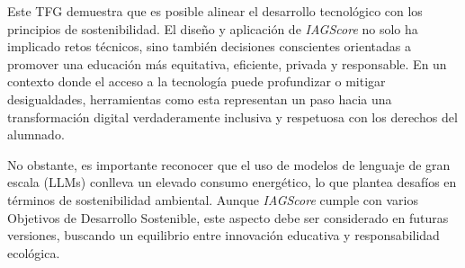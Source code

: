 Este TFG demuestra que es posible alinear el desarrollo tecnológico con los principios de sostenibilidad. El diseño y aplicación de \textit{IAGScore} no solo ha implicado retos técnicos, sino también decisiones conscientes orientadas a promover una educación más equitativa, eficiente, privada y responsable. En un contexto donde el acceso a la tecnología puede profundizar o mitigar desigualdades, herramientas como esta representan un paso hacia una transformación digital verdaderamente inclusiva y respetuosa con los derechos del alumnado.

No obstante, es importante reconocer que el uso de modelos de lenguaje de gran escala (LLMs) conlleva un elevado consumo energético, lo que plantea desafíos en términos de sostenibilidad ambiental. Aunque \textit{IAGScore} cumple con varios Objetivos de Desarrollo Sostenible, este aspecto debe ser considerado en futuras versiones, buscando un equilibrio entre innovación educativa y responsabilidad ecológica.